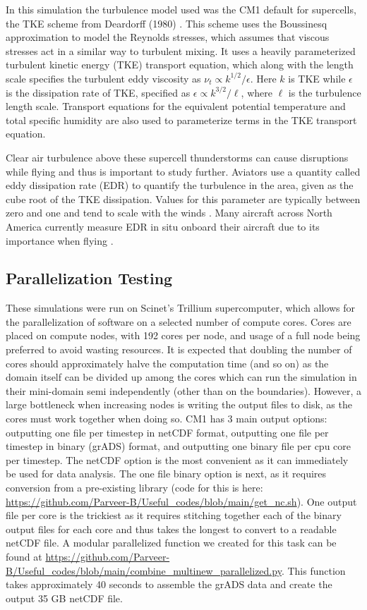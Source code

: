 \documentclass[12pt]{article}
\begin{document}
In this simulation the turbulence model used was the CM1 default for supercells, the TKE scheme from Deardorff (1980) \cite{deardorff_stratocumulus-capped_1980}. This scheme uses the Boussinesq approximation to model the Reynolds stresses, which assumes that viscous stresses act in a similar way to turbulent mixing. It uses a heavily parameterized turbulent kinetic energy (TKE) transport equation, which along with the length scale specifies the turbulent eddy viscosity as $\nu_{t} \propto k^{1/2}/\epsilon$. Here $k$ is TKE while $\epsilon$ is the dissipation rate of TKE, specified as $\epsilon \propto k^{3/2}/\ell$, where $\ell$ is the turbulence length scale. Transport equations for the equivalent potential temperature and total specific humidity are also used to parameterize terms in the TKE transport equation. 

Clear air turbulence above these supercell thunderstorms can cause disruptions while flying and thus is important to study further. Aviators use a quantity called eddy dissipation rate (EDR) to quantify the turbulence in the area, given as the cube root of the TKE dissipation. Values for this parameter are typically between zero and one and tend to scale with the winds \cite{meymaris_insitu_2022}. Many aircraft across North America currently measure EDR in situ onboard their aircraft due to its importance when flying \cite{meymaris_insitu_2022}.

\subsection{Parallelization Testing}
These simulations were run on Scinet's Trillium supercomputer, which allows for the parallelization of software on a selected number of compute cores. Cores are placed on compute nodes, with 192 cores per node, and usage of a full node being preferred to avoid wasting resources. It is expected that doubling the number of cores should approximately halve the computation time (and so on) as the domain itself can be divided up among the cores which can run the simulation in their mini-domain semi independently (other than on the boundaries). However, a large bottleneck when increasing nodes is writing the output files to disk, as the cores must work together when doing so. CM1 has 3 main output options: outputting one file per timestep in netCDF format, outputting one file per timestep in binary (grADS) format, and outputting one binary file per cpu core per timestep. The netCDF option is the most convenient as it can immediately be used for data analysis. The one file binary option is next, as it requires conversion from a pre-existing library (code for this is here: \url{https://github.com/Parveer-B/Useful_codes/blob/main/get_nc.sh}). One output file per core is the trickiest as it requires stitching together each of the binary output files for each core and thus takes the longest to convert to a readable netCDF file. A modular parallelized function we created for this task can be found at \url{https://github.com/Parveer-B/Useful_codes/blob/main/combine_multinew_parallelized.py}. This function takes approximately 40 seconds to assemble the grADS data and create the output 35 GB netCDF file.
\end{document}
